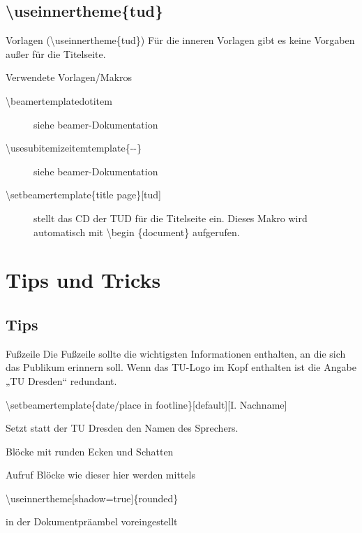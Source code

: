 \documentclass[presentation,t]{beamer}
\begin{document}
\subsection{\textbackslash useinnertheme\{tud\}}
\label{sec:orgfd0f188}

\begin{frame}[allowframebreaks]{Vorlagen (\textbackslash useinnertheme\{tud\})}
Für die inneren Vorlagen gibt es keine Vorgaben außer für die
Titelseite.
\begin{block}{Verwendete Vorlagen/Makros}
\begin{description}
\item[{\textbackslash beamertemplatedotitem}] siehe beamer-Dokumentation
\item[{\textbackslash usesubitemizeitemtemplate\{-\/-\}}] siehe
beamer-Dokumentation
\item[{\textbackslash setbeamertemplate\{title page\}[tud]}] stellt das CD
der TUD für die Titelseite ein. Dieses Makro wird automatisch mit
\textbackslash begin \{document\} aufgerufen.
\end{description}
\end{block}
\end{frame}

\section{Tips und Tricks}
\label{sec:org9174b2b}
\subsection{Tips}
\label{sec:org5a964d7}
\begin{frame}[label={sec:org624775f}]{Fußzeile}
Die Fußzeile sollte die wichtigsten Informationen enthalten, an die
sich das Publikum erinnern soll. Wenn das TU-Logo im Kopf enthalten
ist die Angabe „TU Dresden“ redundant.

\textbackslash setbeamertemplate\{date/place in
footline\}[default][I. Nachname]

Setzt statt der TU Dresden den Namen
des Sprechers.
\end{frame}
\begin{frame}[label={sec:orge908428}]{Blöcke mit runden Ecken und Schatten}
\begin{block}{Aufruf}
Blöcke wie dieser hier werden mittels 

\textbackslash useinnertheme[shadow=true]\{rounded\}

in der Dokumentpräambel voreingestellt
\end{block}
\end{frame}
\end{document}
